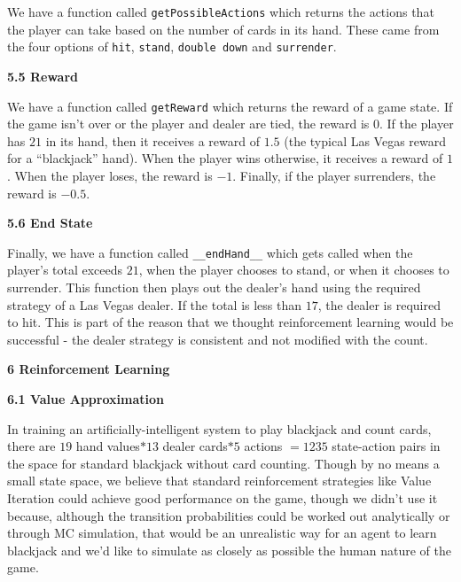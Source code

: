 \documentclass[12pt]{article}
\begin{document}
    We have a function called \texttt{getPossibleActions} which returns the actions that the player can take based on the number of cards in its hand. These came from the four options of \texttt{hit}, \texttt{stand}, \texttt{double down} and \texttt{surrender}. \newline 

   \textbf{5.5 Reward} \newline

    We have a function called \texttt{getReward} which returns the reward of a game state. If the game isn't over or the player and dealer are tied, the reward is $0$. If the player has $21$ in its hand, then it receives a reward of $1.5$ (the typical Las Vegas reward for a ``blackjack'' hand). When the player wins otherwise, it receives a reward of $1$. When the player loses, the reward is $-1$. Finally, if the player surrenders, the reward is $-0.5$. \newline

    \textbf{5.6 End State} \newline

    Finally, we have a function called \texttt{\_\_endHand\_\_} which gets called when the player's total exceeds $21$, when the player chooses to stand, or when it chooses to surrender. This function then plays out the dealer's hand using the required strategy of a Las Vegas dealer. If the total is less than $17$, the dealer is required to hit. This is part of the reason that we thought reinforcement learning would be successful - the dealer strategy is consistent and not modified with the count. \newline

    {\large \textbf{6 Reinforcement Learning}} \newline

    \textbf{6.1 Value Approximation} \newline

    In training an artificially-intelligent system to play blackjack and count cards, there are $19$ hand values$* 13$ dealer cards$* 5$ actions $= 1235$ state-action pairs in the space for standard blackjack without card counting. Though by no means a small state space, we believe that standard reinforcement strategies like Value Iteration could achieve good performance on the game, though we didn't use it because, although the transition probabilities could be worked out analytically or through MC simulation, that would be an unrealistic way for an agent to learn blackjack and we'd like to simulate as closely as possible the human nature of the game. \newline
\end{document}
